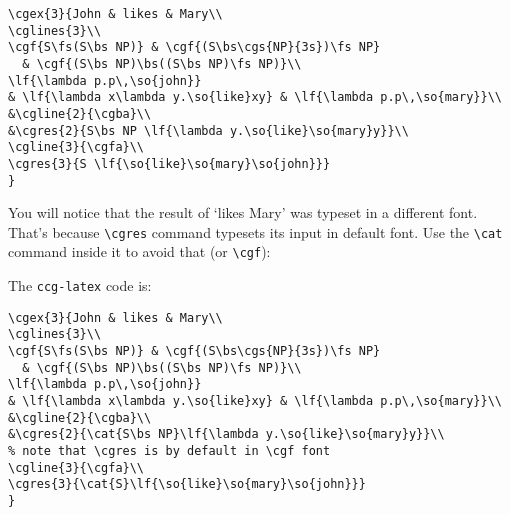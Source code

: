 \documentclass[11pt]{article}
\begin{document}
\begin{verbatim}
\cgex{3}{John & likes & Mary\\
\cglines{3}\\
\cgf{S\fs(S\bs NP)} & \cgf{(S\bs\cgs{NP}{3s})\fs NP} 
  & \cgf{(S\bs NP)\bs((S\bs NP)\fs NP)}\\
\lf{\lambda p.p\,\so{john}} 
& \lf{\lambda x\lambda y.\so{like}xy} & \lf{\lambda p.p\,\so{mary}}\\
&\cgline{2}{\cgba}\\
&\cgres{2}{S\bs NP \lf{\lambda y.\so{like}\so{mary}y}}\\  
\cgline{3}{\cgfa}\\
\cgres{3}{S \lf{\so{like}\so{mary}\so{john}}}
}
\end{verbatim}
\newpage

You will notice that the result of `likes Mary' was typeset in a different font.
That's because \verb|\cgres| command typesets its input in default font.
Use the \verb|\cat| command inside it to avoid that (or \verb|\cgf|):

\medskip\bigskip

The \verb|ccg-latex| code is:

\begin{verbatim}
\cgex{3}{John & likes & Mary\\
\cglines{3}\\
\cgf{S\fs(S\bs NP)} & \cgf{(S\bs\cgs{NP}{3s})\fs NP} 
  & \cgf{(S\bs NP)\bs((S\bs NP)\fs NP)}\\
\lf{\lambda p.p\,\so{john}} 
& \lf{\lambda x\lambda y.\so{like}xy} & \lf{\lambda p.p\,\so{mary}}\\
&\cgline{2}{\cgba}\\
&\cgres{2}{\cat{S\bs NP}\lf{\lambda y.\so{like}\so{mary}y}}\\  
% note that \cgres is by default in \cgf font
\cgline{3}{\cgfa}\\
\cgres{3}{\cat{S}\lf{\so{like}\so{mary}\so{john}}}
}
\end{verbatim}
\end{document}
